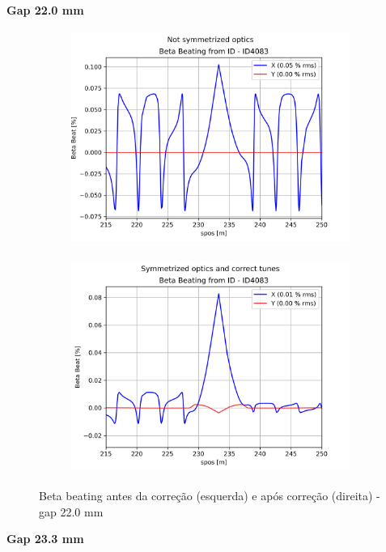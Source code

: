 \documentclass[a4paper,12pt]{article}
\begin{document}
\textbf{Gap 22.0 mm} \\

\begin{figure}[H]
\begin{subfigure}{0.5\textwidth}
\includegraphics[width=0.9\linewidth, height=7cm]{figs/phase-25 gap22 uncorrected-optics.png} 
\label{fig:subim1-2522}
\end{subfigure}
\begin{subfigure}{0.5\textwidth}
\includegraphics[width=0.9\linewidth, height=7cm]{figs/phase-25 gap22 corrected-optics-tunes.png}
\label{fig:subim2-2522}
\end{subfigure}
\caption{Beta beating antes da correção (esquerda) e após correção (direita) - gap 22.0 mm}
\label{fig:bb-25_22}
\end{figure}

\textbf{Gap 23.3 mm} \\
\end{document}
